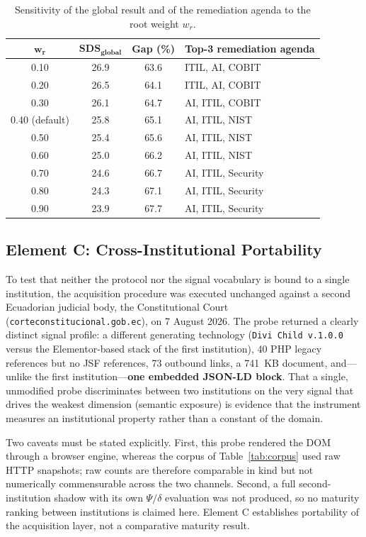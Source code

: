 \documentclass[engproc,article,submit,moreauthors]{Definitions/mdpi}
\begin{document}
\begin{table}[H]
\small
\caption{Sensitivity of the global result and of the remediation agenda to the root weight $w_r$.\label{tab:sensitivity}}
\begin{tabularx}{\textwidth}{cccX}
\toprule
$\mathbf{w_r}$ & $\mathbf{SDS_{global}}$ & \textbf{Gap (\%)} & \textbf{Top-3 remediation agenda}\\
\midrule
0.10 & 26.9 & 63.6 & ITIL, AI, COBIT\\
0.20 & 26.5 & 64.1 & ITIL, AI, COBIT\\
0.30 & 26.1 & 64.7 & AI, ITIL, COBIT\\
0.40 (default) & 25.8 & 65.1 & AI, ITIL, NIST\\
0.50 & 25.4 & 65.6 & AI, ITIL, NIST\\
0.60 & 25.0 & 66.2 & AI, ITIL, NIST\\
0.70 & 24.6 & 66.7 & AI, ITIL, Security\\
0.80 & 24.3 & 67.1 & AI, ITIL, Security\\
0.90 & 23.9 & 67.7 & AI, ITIL, Security\\
\bottomrule
\end{tabularx}
\end{table}

\subsection{Element C: Cross-Institutional Portability}
To test that neither the protocol nor the signal vocabulary is bound to a single institution, the acquisition procedure was executed unchanged against a second Ecuadorian judicial body, the Constitutional Court (\texttt{corteconstitucional\-.gob\-.ec}), on 7 August 2026. The probe returned a clearly distinct signal profile: a different generating technology (\texttt{Divi Child v.1.0.0} versus the Elementor-based stack of the first institution), 40 PHP legacy references but no JSF references, 73 outbound links, a 741~KB document, and---unlike the first institution---\textbf{one embedded JSON-LD block}. That a single, unmodified probe discriminates between two institutions on the very signal that drives the weakest dimension (semantic exposure) is evidence that the instrument measures an institutional property rather than a constant of the domain.

Two caveats must be stated explicitly. First, this probe rendered the DOM through a browser engine, whereas the corpus of Table~\ref{tab:corpus} used raw HTTP snapshots; raw counts are therefore comparable in kind but not numerically commensurable across the two channels. Second, a full second-institution shadow with its own $\Psi/\delta$ evaluation was not produced, so no maturity ranking between institutions is claimed here. Element C establishes portability of the acquisition layer, not a comparative maturity result.
\end{document}
